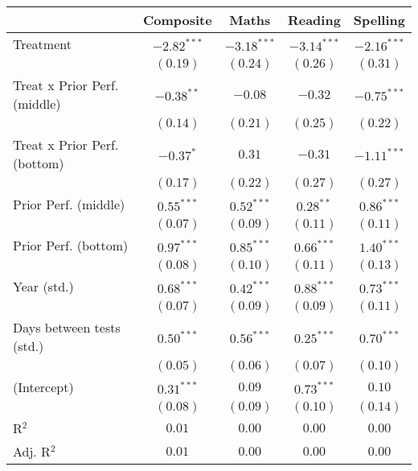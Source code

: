
\begin{table}
\begin{center}
\begin{tabular}{l c c c c}
\hline
 & Composite & Maths & Reading & Spelling \\
\hline
Treatment                    & $-2.82^{***}$ & $-3.18^{***}$ & $-3.14^{***}$ & $-2.16^{***}$ \\
                             & $(0.19)$      & $(0.24)$      & $(0.26)$      & $(0.31)$      \\
Treat x Prior Perf. (middle) & $-0.38^{**}$  & $-0.08$       & $-0.32$       & $-0.75^{***}$ \\
                             & $(0.14)$      & $(0.21)$      & $(0.25)$      & $(0.22)$      \\
Treat x Prior Perf. (bottom) & $-0.37^{*}$   & $0.31$        & $-0.31$       & $-1.11^{***}$ \\
                             & $(0.17)$      & $(0.22)$      & $(0.27)$      & $(0.27)$      \\
Prior Perf. (middle)         & $0.55^{***}$  & $0.52^{***}$  & $0.28^{**}$   & $0.86^{***}$  \\
                             & $(0.07)$      & $(0.09)$      & $(0.11)$      & $(0.11)$      \\
Prior Perf. (bottom)         & $0.97^{***}$  & $0.85^{***}$  & $0.66^{***}$  & $1.40^{***}$  \\
                             & $(0.08)$      & $(0.10)$      & $(0.11)$      & $(0.13)$      \\
Year (std.)                  & $0.68^{***}$  & $0.42^{***}$  & $0.88^{***}$  & $0.73^{***}$  \\
                             & $(0.07)$      & $(0.09)$      & $(0.09)$      & $(0.11)$      \\
Days between tests (std.)    & $0.50^{***}$  & $0.56^{***}$  & $0.25^{***}$  & $0.70^{***}$  \\
                             & $(0.05)$      & $(0.06)$      & $(0.07)$      & $(0.10)$      \\
(Intercept)                  & $0.31^{***}$  & $0.09$        & $0.73^{***}$  & $0.10$        \\
                             & $(0.08)$      & $(0.09)$      & $(0.10)$      & $(0.14)$      \\
\hline
R$^2$                        & $0.01$        & $0.00$        & $0.00$        & $0.00$        \\
Adj. R$^2$                   & $0.01$        & $0.00$        & $0.00$        & $0.00$        \\

\end{tabular}
\end{center}
\end{table}
